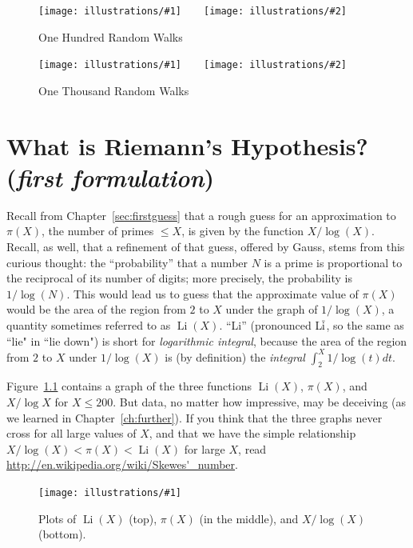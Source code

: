 \documentclass[openany]{book}
\DeclareMathOperator{\Li}{Li}
\newcommand{\ill}[3]{%
   \begin{figure}[H]%
   \vspace{-2ex}
   \centering%
   \texttt{[image: illustrations/\#1]}%
   \caption{#3}%
   \vspace{-2ex}
    \end{figure}}
\newcommand{\illtwo}[4]{%
   \begin{figure}[H]\centering%
   \texttt{[image: illustrations/\#1]}$\qquad$\texttt{[image: illustrations/\#2]}%
   \caption{#4}%
    \end{figure}}
\theoremstyle{plain}
\theoremstyle{definition}
\begin{document}
\illtwo{random_walks-100}{random_walks-100-mean}{.45}{One Hundred Random Walks\label{fig:random_walks_100}}

\illtwo{random_walks-1000}{random_walks-1000-mean}{.45}{One Thousand Random Walk\index{random walk}s\label{fig:random_walks_1000}}





\chapter[What is Riemann's Hypothesis?] { What is Riemann's Hypothesis?  ({\em first formulation})\label{sec:rh1}}



Recall from Chapter~\ref{sec:firstguess} that a rough guess for an approximation to
$\pi(X)$, the number of primes $\leq{} X$, is given by the function
$X/\log(X)$. Recall, as well, that a refinement of that guess, offered by Gauss, stems from this curious thought:  the ``probability'' that a number $N$ is a prime  is proportional to the reciprocal of its number of digits; more precisely, the probability is $1/\log(N)$.  This would lead us to  guess that the approximate value of $\pi(X)$ would be
the area of the region from $2$ to $X$ under the graph of
$1/\log(X)$, a quantity sometimes referred to as $\Li(X)$.
``Li'' (pronounced L$\overline{\rm i}$, so the same as ``lie" in ``lie down")
is short for {\em logarithmic integral},
because the area of the region from $2$ to $X$ under $1/\log(X)$
is (by definition) the {\em integral} $\int_2^X 1/\log(t) dt$.




Figure~\ref{fig:threeplots} contains a graph of the three functions
$\Li(X)$, $\pi(X)$, and $X/\log X$ for $X\leq 200$.
But data, no matter how impressive, may be deceiving (as we learned in
Chapter~\ref{ch:further}). If you think
that  the three graphs  never cross for all large values of $X$,  and
that we have the simple relationship  $X/\log(X) < \pi(X) < \Li(X)$ for
large $X$, read \url{http://en.wikipedia.org/wiki/Skewes'_number}.


\ill{three_plots}{.9}{Plots of $\Li(X)$ (top), $\pi(X)$ (in the middle), and $X/\log(X)$ (bottom).\label{fig:threeplots}}
\end{document}
